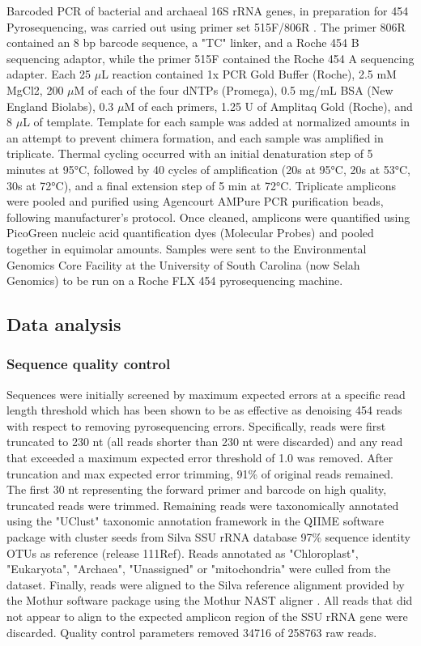 Barcoded PCR of bacterial and archaeal 16S rRNA genes, in preparation for 454 Pyrosequencing, was carried out using primer set 515F/806R \cite{21349862}. The primer 806R contained an 8 bp barcode sequence, a "TC" linker, and a Roche 454 B sequencing adaptor, while the primer 515F contained the Roche 454 A sequencing adapter. Each 25 $\mu$L reaction contained 1x PCR Gold Buffer (Roche), 2.5 mM MgCl2, 200 $\mu$M of each of the four dNTPs (Promega), 0.5 mg/mL BSA (New England Biolabs), 0.3 $\mu$M of each primers, 1.25 U of Amplitaq Gold (Roche), and 8 $\mu$L of template. Template for each sample was added at normalized amounts in an attempt to prevent chimera formation, and each sample was amplified in triplicate. Thermal cycling occurred with an initial denaturation step of 5 minutes at 95°C, followed by 40 cycles of amplification (20s at 95°C, 20s at 53°C, 30s at 72°C), and a final extension step of 5 min at 72°C. Triplicate amplicons were pooled and purified using Agencourt AMPure PCR purification beads, following manufacturer’s protocol. Once cleaned, amplicons were quantified using PicoGreen nucleic acid quantification dyes (Molecular Probes) and pooled together in equimolar amounts. Samples were sent to the Environmental Genomics Core Facility at the University of South Carolina (now Selah Genomics) to be run on a Roche FLX 454 pyrosequencing machine. 

\subsection{Data analysis} 

\subsubsection{Sequence quality control} Sequences were initially screened by maximum expected errors at a specific read length threshold \cite{23955772} which has been shown to be as effective as denoising 454 reads with respect to removing pyrosequencing errors. Specifically, reads were first truncated to 230 nt (all reads shorter than 230 nt were discarded) and any read that exceeded a maximum expected error threshold of 1.0 was removed. After truncation and max expected error trimming, 91\% of original reads remained. The first 30 nt representing the forward primer and barcode on high quality, truncated reads were trimmed. Remaining reads were taxonomically annotated using the "UClust" taxonomic annotation framework in the QIIME software package \cite{20383131, 20709691} with cluster seeds from Silva SSU rRNA database \cite{17947321} 97\% sequence identity OTUs as reference (release 111Ref). Reads annotated as "Chloroplast", "Eukaryota", "Archaea", "Unassigned" or "mitochondria" were culled from the dataset. Finally, reads were aligned to the Silva reference alignment provided by the Mothur software package \cite{19801464} using the Mothur NAST aligner \cite{16845035}. All reads that did not appear to align to the expected amplicon region of the SSU rRNA gene were discarded. Quality control parameters removed 34716 of 258763 raw reads.

